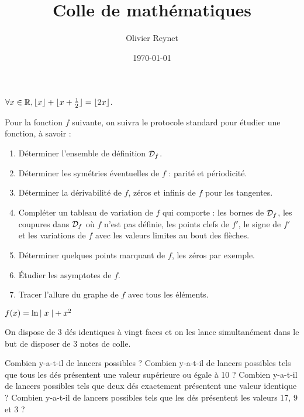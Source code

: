 \documentclass[french,12pt,a4paper]{article}
\author{Olivier Reynet}
\title{Colle de mathématiques}
\date{\today}
\begin{document}
\maketitle


\begin{exercise}[subtitle= Partie entière]
		 \Mq $\forall x \in \mathbb{R}, \lfloor x \rfloor + \lfloor x + \frac{1}{2} \rfloor = \lfloor 2 x \rfloor$.
\end{exercise}


\begin{exercise}[subtitle= Étude d'une fonction]
	Pour la fonction $f$ suivante, on suivra le protocole standard pour étudier une fonction, à savoir :
	\begin{enumerate}
		\item Déterminer l'ensemble de définition $\mathcal{D}_f$.
		\item Déterminer les symétries éventuelles de $f$ : parité et périodicité.
		\item Déterminer la dérivabilité de $f$,  zéros et infinis de $f$ pour les tangentes.
		\item Compléter un tableau de variation de $f$ qui comporte : les bornes de $\mathcal{D}_f$, les coupures dans $\mathcal{D}_f$ où $f$ n'est pas définie, les points clefs de $f'$, le signe de $f'$ et les variations de $f$ avec les valeurs limites au bout des flèches.
		\item Déterminer quelques points marquant de $f$, les zéros par exemple.
		\item Étudier les asymptotes de $f$.
		\item Tracer l'allure du graphe de $f$ avec tous les éléments.
	\end{enumerate}

	$f(x)= \ln{\mid x \mid}+x^2$

\end{exercise}

	\begin{exercise}[subtitle= Dé à 20 faces]
		On dispose de 3 dés identiques à vingt faces et on les lance simultanément dans le but de disposer de 3 notes de colle. 
		\begin{tasks}
			\task Combien y-a-t-il de lancers possibles ?
			\task Combien y-a-t-il de lancers possibles tels que tous les dés présentent une valeur supérieure ou égale à 10 ?
			\task Combien y-a-t-il de lancers possibles tels que deux dés exactement présentent une valeur identique ? 
			\task Combien y-a-t-il de lancers possibles tels que les dés présentent  les valeurs 17, 9 et 3 ?
		\end{tasks}
	\end{exercise}
\end{document}
